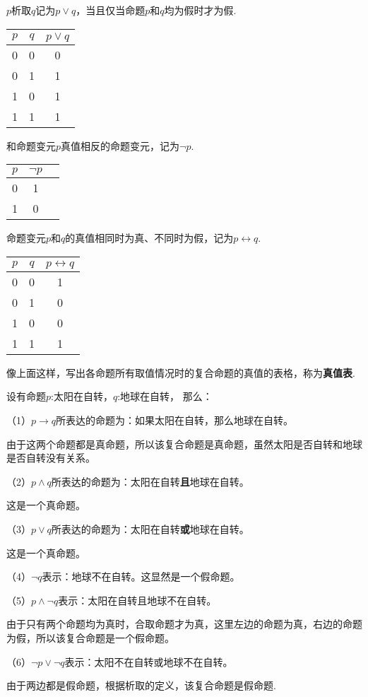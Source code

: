 \begin{definition}[析取]
    $p$析取$q$记为$p \vee q$，当且仅当命题$p$和$q$均为假时才为假.
\end{definition}
\begin{tabular}{c|c|c}
    $p$ & $q$ & $p \vee q$ \\
    \hline
    0 & 0 & 0 \\
    0 & 1 & 1 \\
    1 & 0 & 1 \\
    1 & 1 & 1
\end{tabular}

\begin{definition}[否定]
    和命题变元$p$真值相反的命题变元，记为$\neg p$.
\end{definition}
\begin{tabular}{c|c|c}
    $p$ & $\neg p$  \\
    \hline
    0 & 1  \\
    1 & 0 
\end{tabular}

\begin{definition}[双条件]
    命题变元$p$和$q$的真值相同时为真、不同时为假，记为$p \leftrightarrow q$.
\end{definition}
\begin{tabular}{c|c|c}
    $p$ & $q$ & $p \leftrightarrow q$ \\
    \hline
    0 & 0 & 1 \\
    0 & 1 & 0 \\
    1 & 0 & 0 \\
    1 & 1 & 1
\end{tabular}

像上面这样，写出各命题所有取值情况时的复合命题的真值的表格，称为\textbf{真值表}.

\begin{example}
    设有命题$p$:太阳在自转，$q$:地球在自转，
    那么：

    （1）$p \to q$所表达的命题为：如果太阳在自转，那么地球在自转。\par
    由于这两个命题都是真命题，所以该复合命题是真命题，虽然太阳是否自转和地球是否自转没有关系。

    （2）$p \wedge q$所表达的命题为：太阳在自转\textbf{且}地球在自转。\par
    这是一个真命题。

    （3）$p \vee q$所表达的命题为：太阳在自转\textbf{或}地球在自转。\par
    这是一个真命题。

    （4）$\neg q$表示：地球不在自转。这显然是一个假命题。

    （5）$p \wedge \neg q$表示：太阳在自转且地球不在自转。\par
    由于只有两个命题均为真时，合取命题才为真，这里左边的命题为真，右边的命题为假，所以该复合命题是一个假命题。

    （6）$\neg p \vee \neg q$表示：太阳不在自转或地球不在自转。\par
    由于两边都是假命题，根据析取的定义，该复合命题是假命题.
\end{example}

